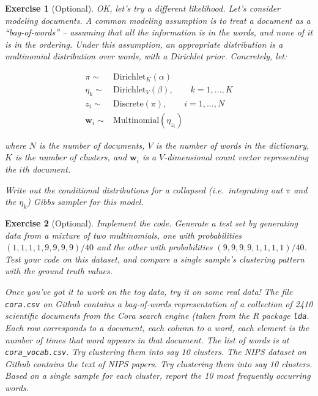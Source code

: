 \documentclass[twoside]{article}
\newcounter{lecnum}
\newtheorem{exercise}{Exercise}[lecnum]
\begin{document}
 \begin{exercise}[Optional]
   OK, let's try a different likelihood. Let's consider modeling documents. A common modeling assumption is to treat a document as a ``bag-of-words'' -- assuming that all the information is in the words, and none of it is in the ordering. Under this assumption, an appropriate distribution is a multinomial distribution over words, with a Dirichlet prior. Concretely, let:

   $$\begin{aligned}
     \pi \sim& \mbox{Dirichlet}_K(\alpha)\\
     \eta_k \sim& \mbox{Dirichlet}_V(\beta),\qquad k=1,\dots,K\\
     z_i \sim& \mbox{Discrete}(\pi),\qquad i=1,\dots, N\\
     \mathbf{w}_i \sim& \mbox{Multinomial}(\eta_{z_i})
   \end{aligned}$$

   where $N$ is the number of documents, $V$ is the number of words in the dictionary, $K$ is the number of clusters, and $\mathbf{w}_i$ is a $V$-dimensional count vector representing the $i$th document.

   Write out the conditional distributions for a collapsed (i.e.\ integrating out $\pi$ and the $\eta_k$) Gibbs sampler for this model.

 \end{exercise}

 \begin{exercise}[Optional]
   Implement the code. Generate a test set by generating data from a mixture of two multinomials, one with probabilities $(1,1,1,1,9,9,9,9)/40$ and the other with probabilities $(9,9,9,9,1,1,1,1)/40$. Test your code on this dataset, and compare a single sample's clustering pattern with the ground truth values.


   Once you've got it to work on the toy data, try it on some real data! The file \texttt{cora.csv} on Github contains a bag-of-words representation of a collection of 2410 scientific documents from the Cora search engine (taken from the R package \texttt{lda}. Each row corresponds to a document, each column to a word, each element is the number of times that word appears in that document. The list of words is at \texttt{cora\_vocab.csv}. Try clustering them into say 10 clusters. The NIPS dataset on Github contains the text of NIPS papers. Try clustering them into say 10 clusters. Based on a single sample for each cluster, report the 10 most frequently occurring words.
 

 \end{exercise}
\end{document}
